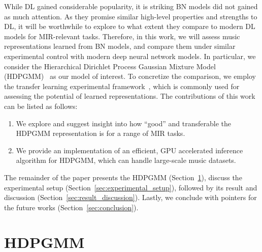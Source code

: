 \documentclass{article}
\begin{document}
While DL gained considerable popularity, it is striking BN models did not gained as much attention. As they promise similar high-level properties and strengths to DL, it will be worthwhile to explore to what extent they compare to modern DL models for MIR-relevant tasks. Therefore, in this work, we will assess music representations learned from BN models, and compare them under similar experimental control with modern deep neural network models.
In particular, we consider the Hierarchical Dirichlet Process Gaussian Mixture Model (HDPGMM)~\cite{DBLP:journals/jmlr/WangPB11,DBLP:conf/ismir/YoshiiG09,doi:10.1198/016214506000000302} as our model of interest. %
To concretize the comparison, we employ the transfer learning experimental framework~\cite{DBLP:journals/nca/KimULH20, DBLP:conf/ismir/ChoiFSC17, DBLP:conf/ismir/DielemanBS11}, which is commonly used for assessing the potential of learned representations. The contributions of this work can be listed as follows:
\begin{enumerate}[noitemsep]
    \item We explore and suggest insight into how ``good'' and transferable the HDPGMM representation is for a range of MIR tasks.
    \item We provide an implementation of an efficient, GPU accelerated inference algorithm for HDPGMM, which can handle large-scale music datasets.
\end{enumerate}
The remainder of the paper presents the HDPGMM (Section~\ref{sec:hdpgmm}), discuss the experimental setup (Section~\ref{sec:experimental_setup}), followed by its result and discussion (Section~\ref{sec:result_discussion}). Lastly, we conclude with pointers for the future works (Section~\ref{sec:conclusion}).


\section{HDPGMM}\label{sec:hdpgmm}
\end{document}
